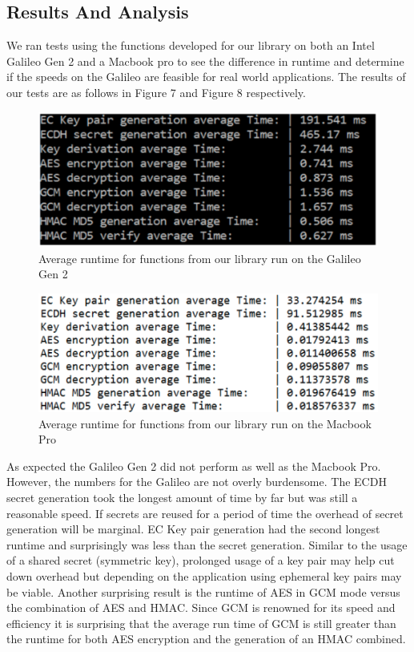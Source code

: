 \subsection{Results And Analysis}
We ran tests using the functions developed for our library on both an Intel Galileo Gen 2 and a Macbook pro to see the difference in runtime and determine if the speeds on the Galileo are feasible for real world applications. The results of our tests are as follows in Figure 7 and Figure 8 respectively.

 \begin{figure}[t]
	\centering
	\includegraphics[width=12cm,height=0.7\textheight,keepaspectratio]{./figures/figure_7}
	\center\caption[font=footnote]{Average runtime for functions from our library run on the Galileo Gen 2}
\end{figure}

 \begin{figure}[t]
	\centering
	\includegraphics[width=12cm,height=0.7\textheight,keepaspectratio]{./figures/figure_8}
	\center\caption[font=footnote]{Average runtime for functions from our library run on the Macbook Pro}
\end{figure}


As expected the Galileo Gen 2 did not perform as well as the Macbook Pro. However, the numbers for the Galileo are not overly burdensome. The ECDH secret generation took the longest amount of time by far but was still a reasonable speed. If secrets are reused for a period of time the overhead of secret generation will be marginal. EC Key pair generation had the second longest runtime and surprisingly was less than the secret generation. Similar to the usage of a shared secret (symmetric key), prolonged usage of a key pair may help cut down overhead but depending on the application using ephemeral key pairs may be viable. Another surprising result is the runtime of AES in GCM mode versus the combination of AES and HMAC. Since GCM is renowned for its speed and efficiency it is surprising that the average run time of GCM is still greater than the runtime for both AES encryption and the generation of an HMAC combined.

